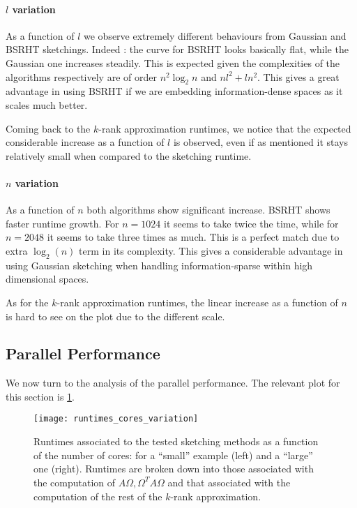 \documentclass[a4paper, 12pt,oneside]{article}
\begin{document}
		\paragraph{$l$ variation}
		As a function of $l$ we observe extremely different behaviours from Gaussian and BSRHT sketchings. Indeed : the curve for BSRHT looks basically flat, while the Gaussian one increases steadily. This is expected given the complexities of the algorithms respectively are of order $n^2\log_2{n}$ and $nl^2 + ln^2$. This gives a great advantage in using BSRHT if we are embedding information-dense spaces as it scales much better.		

		Coming back to the $k$-rank approximation runtimes, we notice that the expected considerable increase as a function of $l$ is observed, even if as mentioned it stays relatively small when compared to the sketching runtime.
		\paragraph{$n$ variation}
		As a function of $n$ both algorithms show significant increase. BSRHT shows faster runtime growth. For $n=1024$ it seems to take twice the time, while for $n=2048$ it seems to take three times as much. This is a perfect match due to extra $\log_2(n)$ term in its complexity. This gives a considerable advantage in using Gaussian sketching when handling information-sparse within high dimensional spaces.

		As for the $k$-rank approximation runtimes, the linear increase as a function of $n$ is hard to see on the plot due to the different scale. 
        \subsection{Parallel Performance}
We now turn to the analysis of the parallel performance. The relevant plot for this section is \ref{fig:runtimes-cores-variation}. 
\begin{figure}[htbp]
    \centering
    \vspace{0em}
    \texttt{[image: runtimes\_cores\_variation]}
    \caption{Runtimes associated to the tested sketching methods as a function of the number of cores: for a ``small'' example (left) and a ``large'' one (right). Runtimes are broken down into those associated with the computation of $A\Omega,\Omega^T A\Omega$ and that associated with the computation of the rest of the $k$-rank approximation.}
    \label{fig:runtimes-cores-variation}
\end{figure}
\end{document}
